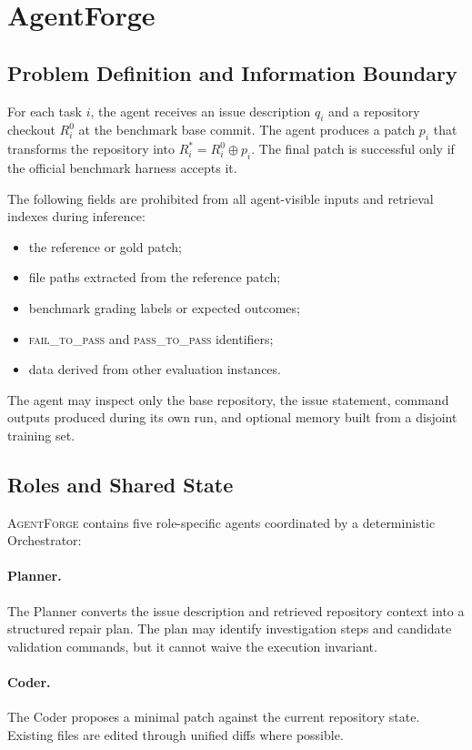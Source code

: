 \documentclass[journal]{IEEEtran}
\newcommand{\agentforge}{\textsc{AgentForge}}
\begin{document}
\section{AgentForge}
\label{sec:method}

\subsection{Problem Definition and Information Boundary}

For each task $i$, the agent receives an issue description $q_i$ and a repository checkout $R_i^0$ at the benchmark base commit. The agent produces a patch $p_i$ that transforms the repository into $R_i^*=R_i^0\oplus p_i$. The final patch is successful only if the official benchmark harness accepts it.

The following fields are prohibited from all agent-visible inputs and retrieval indexes during inference:
\begin{itemize}
    \item the reference or gold patch;
    \item file paths extracted from the reference patch;
    \item benchmark grading labels or expected outcomes;
    \item \textsc{fail\_to\_pass} and \textsc{pass\_to\_pass} identifiers;
    \item data derived from other evaluation instances.
\end{itemize}
The agent may inspect only the base repository, the issue statement, command outputs produced during its own run, and optional memory built from a disjoint training set.

\subsection{Roles and Shared State}

\agentforge{} contains five role-specific agents coordinated by a deterministic Orchestrator:

\paragraph{Planner.} The Planner converts the issue description and retrieved repository context into a structured repair plan. The plan may identify investigation steps and candidate validation commands, but it cannot waive the execution invariant.

\paragraph{Coder.} The Coder proposes a minimal patch against the current repository state. Existing files are edited through unified diffs where possible.
\end{document}
